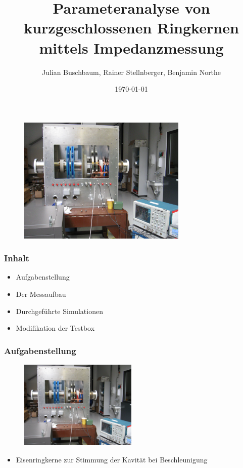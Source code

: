 \documentclass[accentcolor=tud9b, colorbacktitle, inverttitle]{tudbeamer}
\author{Julian Buschbaum, Rainer Stellnberger, Benjamin Northe}
\institute{Institut TEMF}
\date{\today}
\title{Parameteranalyse von kurzgeschlossenen Ringkernen mittels Impedanzmessung}
\begin{document}
\begin{titleframe}
\vspace{-1em}
	\begin{figure}[h]
		\centering
		\includegraphics[width=0.72\textwidth]{Kavitaet}
	\end{figure}

\end{titleframe}





\begin{frame}\frametitle{Inhalt}
	\begin{itemize}
		\item Aufgabenstellung
		\item Der Messaufbau
		\item Durchgef\"uhrte Simulationen
		\item Modifikation der Testbox
	\end{itemize}
\end{frame}


\begin{frame}\frametitle{Aufgabenstellung}
\begin{multicols}{2}
\vspace{-2em}
	\begin{figure}[h]
		\centering
		\includegraphics[width=0.5\textwidth]{Kavitaet}
	\end{figure}
	\vfill\null
	\columnbreak
	\begin{itemize}
		\item Eisenringkerne zur Stimmung der Kavit\"at bei Beschleunigung 
	\end{itemize}
\end{multicols}
\end{frame}
\end{document}
